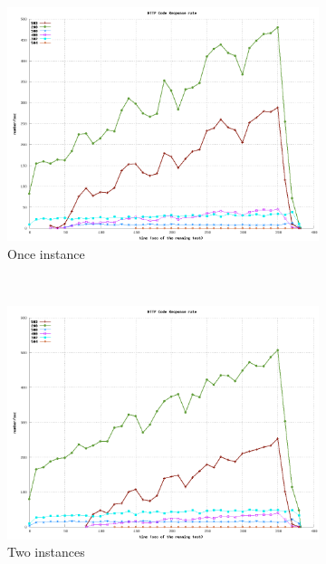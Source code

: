 \documentclass[dvips,12pt]{article}
\begin{document}
\begin{figure}[h!]
    \centering
    \begin{subfigure}[b]{0.3\textwidth}
        \includegraphics[width=\textwidth]{images/horizontal_m3large_dbm3large/http_1.png}
        \caption{Once instance}
    \end{subfigure}
    ~ 
    \begin{subfigure}[b]{0.3\textwidth}
        \includegraphics[width=\textwidth]{images/horizontal_m3large_dbm3large/http_2.png}
        \caption{Two instances}
    \end{subfigure}
    ~ 
    \begin{subfigure}[b]{0.3\textwidth}

\end{subfigure}
\end{figure}
\end{document}
